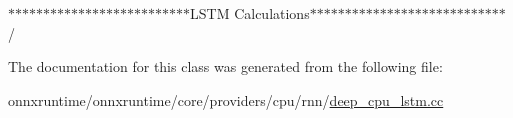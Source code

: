 $\ast$$\ast$$\ast$$\ast$$\ast$$\ast$$\ast$$\ast$$\ast$$\ast$$\ast$$\ast$$\ast$$\ast$$\ast$$\ast$$\ast$$\ast$$\ast$$\ast$$\ast$$\ast$$\ast$$\ast$$\ast$$\ast$\+L\+S\+TM Calculations$\ast$$\ast$$\ast$$\ast$$\ast$$\ast$$\ast$$\ast$$\ast$$\ast$$\ast$$\ast$$\ast$$\ast$$\ast$$\ast$$\ast$$\ast$$\ast$$\ast$$\ast$$\ast$$\ast$$\ast$$\ast$$\ast$$\ast$$\ast$/ 

The documentation for this class was generated from the following file\+:\begin{DoxyCompactItemize}
\item 
onnxruntime/onnxruntime/core/providers/cpu/rnn/\mbox{\hyperlink{deep__cpu__lstm_8cc}{deep\+\_\+cpu\+\_\+lstm.\+cc}}\end{DoxyCompactItemize}
